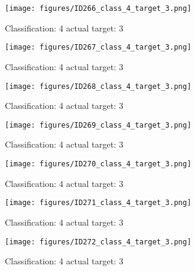 \begin{figure}[h!]
\begin{center}
\texttt{[image: figures/ID266\_class\_4\_target\_3.png]}
\end{center}
\caption{ Classification: 4 actual target: 3}
\label{fig:ID266_class_4_target_3}
\end{figure}
\begin{figure}[h!]
\begin{center}
\texttt{[image: figures/ID267\_class\_4\_target\_3.png]}
\end{center}
\caption{ Classification: 4 actual target: 3}
\label{fig:ID267_class_4_target_3}
\end{figure}
\begin{figure}[h!]
\begin{center}
\texttt{[image: figures/ID268\_class\_4\_target\_3.png]}
\end{center}
\caption{ Classification: 4 actual target: 3}
\label{fig:ID268_class_4_target_3}
\end{figure}
\begin{figure}[h!]
\begin{center}
\texttt{[image: figures/ID269\_class\_4\_target\_3.png]}
\end{center}
\caption{ Classification: 4 actual target: 3}
\label{fig:ID269_class_4_target_3}
\end{figure}
\begin{figure}[h!]
\begin{center}
\texttt{[image: figures/ID270\_class\_4\_target\_3.png]}
\end{center}
\caption{ Classification: 4 actual target: 3}
\label{fig:ID270_class_4_target_3}
\end{figure}
\begin{figure}[h!]
\begin{center}
\texttt{[image: figures/ID271\_class\_4\_target\_3.png]}
\end{center}
\caption{ Classification: 4 actual target: 3}
\label{fig:ID271_class_4_target_3}
\end{figure}
\begin{figure}[h!]
\begin{center}
\texttt{[image: figures/ID272\_class\_4\_target\_3.png]}
\end{center}
\caption{ Classification: 4 actual target: 3}
\label{fig:ID272_class_4_target_3}
\end{figure}
